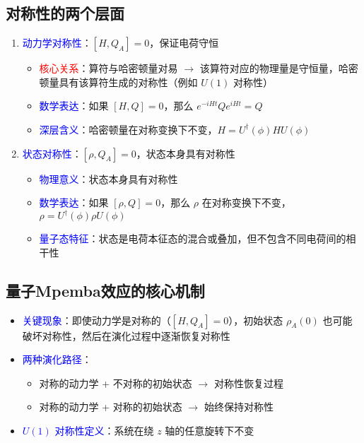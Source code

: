 \documentclass[11pt,a4paper]{article}
\begin{document}
\subsection{对称性的两个层面}
\begin{enumerate}
    \item \textcolor{blue}{动力学对称性}：$[H, Q_A] = 0$，保证电荷守恒
    \begin{itemize}
        \item \textcolor{red}{核心关系}：算符与哈密顿量对易 $\rightarrow$ 该算符对应的物理量是守恒量，哈密顿量具有该算符生成的对称性（例如 $U(1)$ 对称性）
        \item \textcolor{blue}{数学表达}：如果 $[H, Q] = 0$，那么 $e^{-iHt} Q e^{iHt} = Q$
        \item \textcolor{blue}{深层含义}：哈密顿量在对称变换下不变，$H = U^\dagger(\phi) H U(\phi)$
    \end{itemize}

    \item \textcolor{blue}{状态对称性}：$[\rho, Q_A] = 0$，状态本身具有对称性
    \begin{itemize}
        \item \textcolor{blue}{物理意义}：状态本身具有对称性
        \item \textcolor{blue}{数学表达}：如果 $[\rho, Q] = 0$，那么 $\rho$ 在对称变换下不变，$\rho = U^\dagger(\phi) \rho U(\phi)$
        \item \textcolor{blue}{量子态特征}：状态是电荷本征态的混合或叠加，但不包含不同电荷间的相干性
    \end{itemize}
\end{enumerate}

\subsection{量子Mpemba效应的核心机制}
\begin{itemize}
    \item \textcolor{blue}{关键现象}：即使动力学是对称的（$[H, Q_A] = 0$），初始状态 $\rho_A(0)$ 也可能破坏对称性，然后在演化过程中逐渐恢复对称性
    
    \item \textcolor{blue}{两种演化路径}：
    \begin{itemize}
        \item 对称的动力学 + 不对称的初始状态 $\rightarrow$ 对称性恢复过程
        \item 对称的动力学 + 对称的初始状态 $\rightarrow$ 始终保持对称性
    \end{itemize}
    
    \item \textcolor{blue}{$U(1)$ 对称性定义}：系统在绕 $z$ 轴的任意旋转下不变
\end{itemize}
\end{document}
